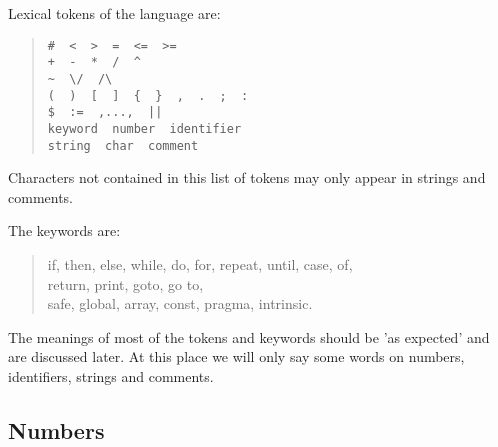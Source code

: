 Lexical tokens of the language are:
\begin{quote}
       \verb/#  <  >  =  <=  >=/  \\
       \verb.+  -  *  /  ^. \\ 
       \verb.~  \/  /\. \\ 
       \verb/(  )  [  ]  {  }  ,  .  ;  :/ \\
       \verb/$  :=  ,...,  ||/ \\ 
       \verb/keyword  number  identifier/ \\
       \verb/string  char  comment/  
\end{quote}
\index{\verb/#/}\index{\verb/</}\index{\verb/>/}
\index{\verb/<=/}\index{\verb/>=/}\index{\verb/=/}
\index{\verb/+/}\index{\verb/-/}
\index{\verb/*/}\index{\verb/^/}
\index{\verb/~/}
\index{\verb/(/}\index{\verb/)/}\index{\verb/,/}
\index{\verb/[/}\index{\verb/]/}\index{\verb/{}/}
\index{\verb/;/}\index{\verb/:/}
\index{\verb/$/}\index{\verb/:=/}
\index{\verb/||/}

Characters not contained in this list of tokens 
may only appear in strings and comments.

The keywords are:
\begin{quote}
      if, then, else, while, do, for, repeat, until, 
      case, of, \\ 
      return, print, goto, go to, \\
      safe, global, array, const, pragma, intrinsic.
\end{quote}

The meanings of most of the tokens and keywords 
should be 'as expected' and are discussed later. 
At this place we will only say some words on
numbers, identifiers, strings and comments.


\subsection{Numbers}

